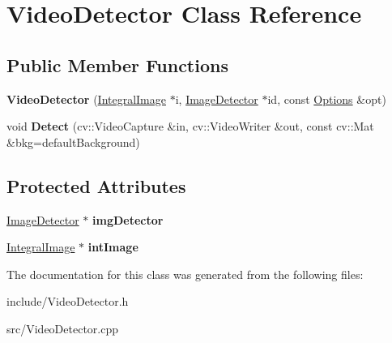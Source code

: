 \hypertarget{classVideoDetector}{}\section{Video\+Detector Class Reference}
\label{classVideoDetector}
\subsection*{Public Member Functions}
\begin{DoxyCompactItemize}
\item 
\hypertarget{classVideoDetector_a85bc8fbc6f137df6f6cbc418f61ae9fc}{}{\bfseries Video\+Detector} (\hyperlink{classIntegralImage}{Integral\+Image} $\ast$i, \hyperlink{classImageDetector}{Image\+Detector} $\ast$id, const \hyperlink{structOptions}{Options} \&opt)\label{classVideoDetector_a85bc8fbc6f137df6f6cbc418f61ae9fc}

\item 
\hypertarget{classVideoDetector_a70bdba6b4f4afc31612ff822927c456d}{}void {\bfseries Detect} (cv\+::\+Video\+Capture \&in, cv\+::\+Video\+Writer \&out, const cv\+::\+Mat \&bkg=default\+Background)\label{classVideoDetector_a70bdba6b4f4afc31612ff822927c456d}

\end{DoxyCompactItemize}
\subsection*{Protected Attributes}
\begin{DoxyCompactItemize}
\item 
\hypertarget{classVideoDetector_aeae5949c4446a47bffcfebc7c1d9cc6e}{}\hyperlink{classImageDetector}{Image\+Detector} $\ast$ {\bfseries img\+Detector}\label{classVideoDetector_aeae5949c4446a47bffcfebc7c1d9cc6e}

\item 
\hypertarget{classVideoDetector_a1f28d8fe02e9e590c68931029551f8b4}{}\hyperlink{classIntegralImage}{Integral\+Image} $\ast$ {\bfseries int\+Image}\label{classVideoDetector_a1f28d8fe02e9e590c68931029551f8b4}

\end{DoxyCompactItemize}


The documentation for this class was generated from the following files\+:\begin{DoxyCompactItemize}
\item 
include/Video\+Detector.\+h\item 
src/Video\+Detector.\+cpp\end{DoxyCompactItemize}
